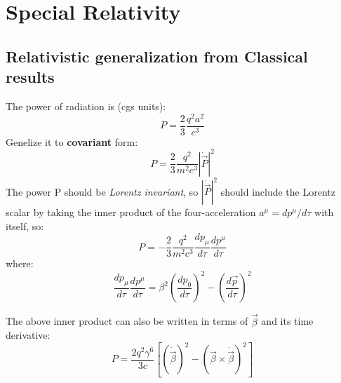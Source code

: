 \chapter{Special Relativity}
\section{Relativistic generalization from Classical results}
The power of radiation is (cgs units):
\[
    P = \frac{2}{3}\frac{q^2a^2}{c^3}
\]
Genelize it to \textbf{covariant} form:
\[
    P = \frac{2}{3}\frac{q^2}{m^2c^3}|\dot{\vec{P}}|^2
\]
The power P should be \emph{Lorentz invariant}, so $|\dot{\vec{P}}|^2$ 
should include the Lorentz scalar by taking the inner product of the 
four-acceleration $a^\mu = dp^\mu/d\tau$ with itself, so:
\[
    P = -\frac{2}{3}\frac{q^2}{m^2c^3}\frac{dp_\mu}{d\tau}\frac{dp^\mu}{d\tau}
\]
where:
\[
    \frac{dp_\mu}{d\tau}\frac{dp^\mu}{d\tau} = \beta^2 \left( \frac{dp_0}{d\tau} \right)^2 - \left( \frac{d\vec{p}}{d\tau} \right)^2
\]

The above inner product can also be written in terms of $\vec{\beta}$ and
its time derivative:
\[
    P = \frac{2q^2\gamma^6}{3c}\left[ (\dot{\vec{\beta}})^2 - (\vec{\beta} \times \dot{\vec{\beta}})^2 \right]
\]



